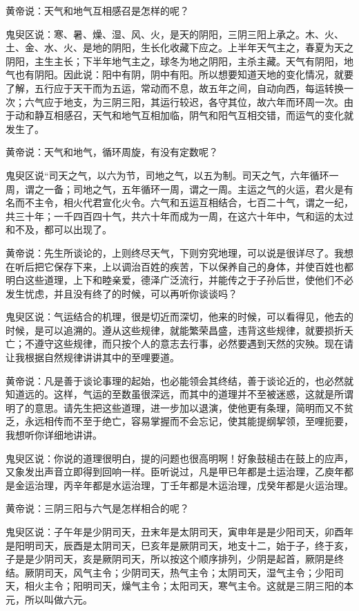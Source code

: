 \documentclass[a4paper,12pt,UTF8,twoside]{ctexbook}
\begin{document}
黄帝说：天气和地气互相感召是怎样的呢？

鬼臾区说：寒、暑、燥、湿、风、火，是天的阴阳，三阴三阳上承之。木、火、土、金、水、火、是地的阴阳，生长化收藏下应之。上半年天气主之，春夏为天之阴阳，主生主长；下半年地气主之，球冬为地之阴阳，主杀主藏。天气有阴阳，地气也有阴阳。因此说：阳中有阴，阴中有阳。所以想要知道天地的变化情况，就要了解，五行应于天干而为五运，常动而不息，故五年之间，自动向西，每运转换一次；六气应于地支，为三阴三阳，其运行较迟，各守其位，故六年而环周一次。由于动和静互相感召，天气和地气互相加临，阴气和阳气互相交错，而运气的变化就发生了。

黄帝说：天气和地气，循环周旋，有没有定数呢？

鬼臾区说“司天之气，以六为节，司地之气，以五为制。司天之气，六年循环一周，谓之一备；司地之气，五年循环一周，谓之一周。主运之气的火运，君火是有名而不主令，相火代君宣化火令。六气和五运互相结合，七百二十气，谓之一纪，共三十年；一千四百四十气，共六十年而成为一周，在这六十年中，气和运的太过和不及，都可以出现了。

黄帝说：先生所谈论的，上则终尽天气，下则穷究地理，可以说是很详尽了。我想在听后把它保存下来，上以调治百姓的疾苦，下以保养自己的身体，并使百姓也都明白这些道理，上下和睦亲爱，德泽广泛流行，并能传之于子孙后世，使他们不必发生忧虑，并且没有终了的时候，可以再听你谈谈吗？

鬼臾区说：气运结合的机理，很是切近而深切，他来的时候，可以看得见，他去的时候，是可以追溯的。遵从这些规律，就能繁荣昌盛，违背这些规律，就要损折夭亡；不遵守这些规律，而只按个人的意志去行事，必然要遇到天然的灾殃。现在请让我根据自然规律讲讲其中的至哩要道。

黄帝说：凡是善于谈论事理的起始，也必能领会其终结，善于谈论近的，也必然就知道远的。这样，气运的至数虽很深远，而其中的道理并不至被迷惑，这就是所谓明了的意思。请先生把这些道理，进一步加以退演，使他更有条理，简明而又不贫乏，永远相传而不至于绝亡，容易掌握而不会忘记，使其能提纲挈领，至哩扼要，我想听你详细地讲讲。

鬼臾区说：你说的道理很明白，提的问题也很高明啊！好象鼓槌击在鼓上的应声，又象发出声音立即得到回响一样。臣听说过，凡是甲已年都是土运治理，乙庾年都是金运治理，丙辛年都是水运治理，丁壬年都是木运治理，戊癸年都是火运治理。

黄帝说：三阴三阳与六气是怎样相合的呢？

鬼臾区说：子午年是少阴司天，丑末年是太阴司天，寅申年是是少阳司天，卯酉年是阳明司天，辰酉是太阴司天，巳亥年是厥阴司天，地支十二，始于子，终于亥，子是是少阴司天，亥是厥阴司天，所以按这个顺序排列，少阴是起首，厥阴是终结。厥阴司天，风气主令；少阴司天，热气主令；太阴司天，湿气主令；少阳司天，相火主令；阳明司天，燥气主令；太阳司天，寒气主令。这就是三阴三阳的本元，所以叫做六元。
\end{document}
